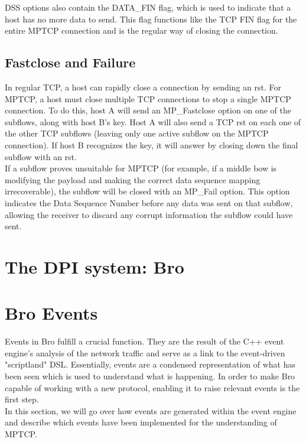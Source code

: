 \documentclass[12pt, a4paper, oneside]{article} %
\begin{document}
DSS options also contain the DATA\_FIN flag, which is used to indicate that a host has no more data to send. This flag functions like the TCP FIN flag for the entire MPTCP connection and is the regular way of closing the connection.

\subsection{Fastclose and Failure}
In regular TCP, a host can rapidly close a connection by sending an rst. For MPTCP, a host must close multiple TCP connections to stop a single MPTCP connection. To do this, host A will send an MP\_Fastclose option on one of the subflows, along with host B's key. Host A will also send a TCP rst on each one of the other TCP subflows (leaving only one active subflow on the MPTCP connection). If host B recognizes the key, it will answer by closing down the final subflow with an rst. \\

If a subflow proves unsuitable for MPTCP (for example, if a middle bow is modifying the payload and making the correct data sequence mapping irrecoverable), the subflow will be closed with an MP\_Fail option. This option indicates the Data Sequence Number before any data was sent on that subflow, allowing the receiver to discard any corrupt information the subflow could have sent.


\section{The DPI system: Bro}



\section{Bro Events}
Events in Bro fulfill a crucial function. They are the result of the C++ event engine's analysis of the network traffic and serve as a link to the event-driven "scriptland" DSL. Essentially, events are a condensed representation of what has been seen which is used to understand what is happening. In order to make Bro capable of working with a new protocol, enabling it to raise relevant events is the first step. \\

In this section, we will go over how events are generated within the event engine and describe which events have been implemented for the understanding of MPTCP.
\end{document}
